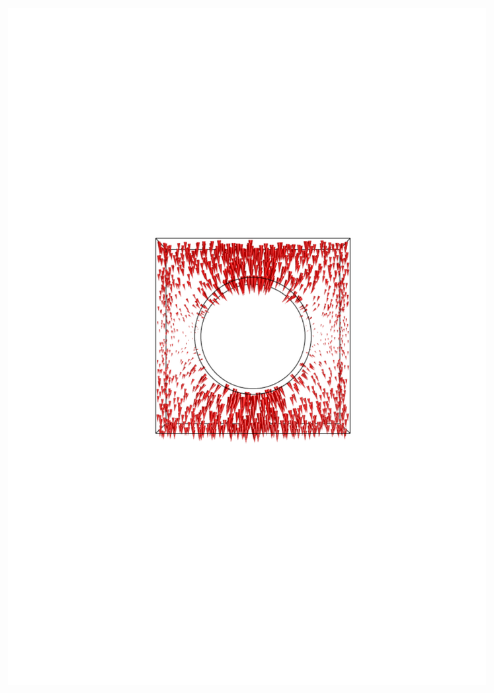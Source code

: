 \documentclass[compress]{beamer}
\begin{document}
\begin{frame}
{\begin{columns}[totalwidth=\textwidth]
\begin{column}{.45\textwidth}
   \end{column}
   \begin{column}{.35\textwidth}
   \centering
   \includegraphics[width=0.99\textwidth]{Graphic/04_E1cylinelecfield_XYview.pdf}
   \end{column}
\end{columns}}
\end{frame}
\end{document}
